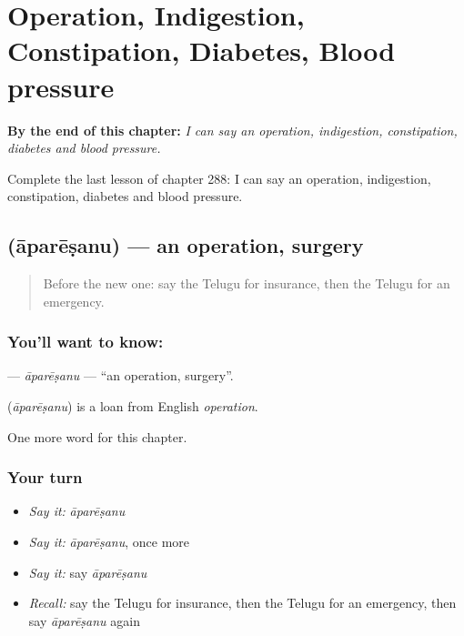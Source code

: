 
\chapter{Operation, Indigestion, Constipation, Diabetes, Blood pressure}
\label{ch:te-operation-indigestion-constipation-diabetes-blood-pressure}

\begin{chapteropening}
\textbf{By the end of this chapter:} \emph{I can say an operation, indigestion, constipation, diabetes and blood pressure.}

Complete the last lesson of chapter 288: I can say an operation, indigestion, constipation, diabetes and blood pressure.
\end{chapteropening}

\section[\texorpdfstring{\te{ఆపరేషను} (āparēṣanu)}{ఆపరేషను (āparēṣanu)}]{ (āparēṣanu) — an operation, surgery}

\label{lesson:TE-C288-aparesanu}



\begin{quote}
Before the new one: say the Telugu for insurance, then the Telugu for an emergency.
\end{quote}

\subsection*{You'll want to know: }
\textbf{} — \emph{āparēṣanu} — \textquotedblleft{}an operation, surgery\textquotedblright{}.

\begin{cousinweb}
\textbf{} (\emph{āparēṣanu}) is a loan from English \emph{operation}.
\end{cousinweb}

\begin{grammarlens}[title={What you've built}]
One more word for this chapter.
\end{grammarlens}

\subsection*{Your turn}
\begin{itemize}
\raggedright
  \item \emph{Say it:} \emph{āparēṣanu}
  \item \emph{Say it:} \emph{āparēṣanu}, once more
  \item \emph{Say it:} say \emph{āparēṣanu}
  \item \emph{Recall:} say the Telugu for insurance, then the Telugu for an emergency, then say \emph{āparēṣanu} again
\end{itemize}

